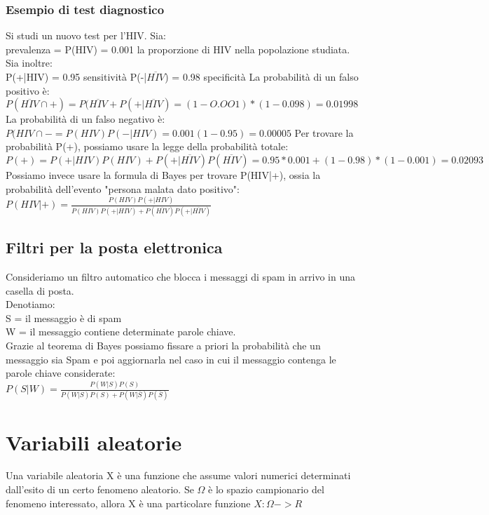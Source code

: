 \documentclass{article}
\begin{document}
\subsubsection{Esempio di test diagnostico}
Si studi un nuovo test per l'HIV.
Sia:\\
prevalenza = P(HIV) = 0.001 la proporzione di HIV nella popolazione studiata.\\
Sia inoltre:\\
P(+|HIV) = 0.95 sensitività
P(-|$\overline{HIV}$) = 0.98 specificità
La probabilità di un falso positivo è:\\
$P(\overline{HIV}\cap{+}) = P(\overline{HIV}+P(+|\overline{HIV}) = (1-O.OO1)*(1-0.098) = 0.01998$\\
La probabilità di un falso negativo è:\\
$P({HIV}\cap{-} = P(HIV)P(-|HIV) = 0.001(1-0.95) = 0.00005$
Per trovare la probabilità P(+), possiamo usare la legge della probabilità totale:\\
$P(+) = P (+|HIV)P(HIV)+P(+|\overline{HIV})P(\overline{HIV}) = 0.95*0.001+(1-0.98)*(1-0.001) = 0.02093$\\
Possiamo invece usare la formula di Bayes per trovare P(HIV|+), ossia la probabilità dell'evento "persona malata dato positivo":\\
$P(HIV|+)=\frac{P(HIV)P(+|HIV)}{P(HIV)P(+|HIV)+P(\overline{HIV})P(+|\overline{HIV})}$
\subsection{Filtri per la posta elettronica}
Consideriamo un filtro automatico che blocca i messaggi di spam in arrivo in una casella di posta.\\
Denotiamo:\\
S = il messaggio è  di spam\\
W =  il messaggio contiene determinate parole chiave.\\
Grazie al teorema di Bayes possiamo fissare a priori la probabilità che un messaggio sia Spam e poi aggiornarla nel caso in cui il messaggio contenga le parole chiave considerate:\\
$P(S|W) = \frac{P(W|S)P(S)}{P(W|S)P(S)+P(W|\overline{S})P(\overline{S})}$
\newpage
\section{Variabili aleatorie}
Una variabile aleatoria X è una funzione che assume  valori numerici determinati dall'esito di un certo fenomeno aleatorio. Se $\Omega$ è lo spazio campionario del fenomeno interessato, allora X è una particolare funzione $X:\Omega->R$\\
\end{document}
